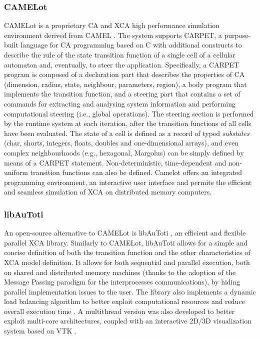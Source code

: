 \subsubsection{CAMELot}
  CAMELot \cite{dattilo2003simulation, Mendicino2006, d2007parallel}
  is a proprietary CA and XCA high performance simulation environment
  derived from CAMEL \cite{cannataro1995parallel}. The system supports
  CARPET, a purpose-built language for CA programming based on C with
  additional constructs to describe the rule of the state transition
  function of a single cell of a cellular automaton and, eventually, to steer the
  application. Specifically, a CARPET program is composed of a declaration part that
  describes the properties of CA (dimension, radius, state, neighbour,
  parameters, region), a body program that implements the transition
  function, and a steering part that contains a set of commands for
  extracting and analysing system information and performing
  computational steering (i.e., global operations). The steering
  section is performed by the runtime system at each iteration, after
  the transition functions of all cells have been evaluated.  The
  state of a cell is defined as a record of typed \emph{substates}
  (char, shorts, integers, floats, doubles and one-dimensional
  arrays), and even complex neighbourhoods (e.g., hexagonal, Margolus)
  can be simply defined by means of a CARPET
  statement. Non-deterministic, time-dependent and non-uniform
  transition functions can also be defined. Camelot offers an
  integrated programming environment, an interactive user interface
  and permits the efficient and seamless simulation of XCA on
  distributed memory computers.
\subsubsection{libAuToti}
  An open-source alternative to CAMELot is libAuToti
  \cite{spingola2008modeling}, an efficient and flexible parallel XCA
  library. Similarly to CAMELot, libAuToti allows for a simple and
  concise definition of both the transition function and the other
  characteristics of XCA model definition. It allows for both
  sequential and parallel execution, both on shared and distributed
  memory machines (thanks to the adoption of the Message Passing
  paradigm for the interprocesses communications), by hiding parallel
  implementation issues to the user. The library also implements a
  dynamic load balancing algorithm to better exploit computational
  resources and reduce overall execution time
  \cite{DBLP:conf/csc/ZitoDSSRA09}. A multithread version was also
  developed to better exploit multi-core architectures, coupled with
  an interactive 2D/3D visualization system based on VTK
  \cite{spataro2010multithread}.
